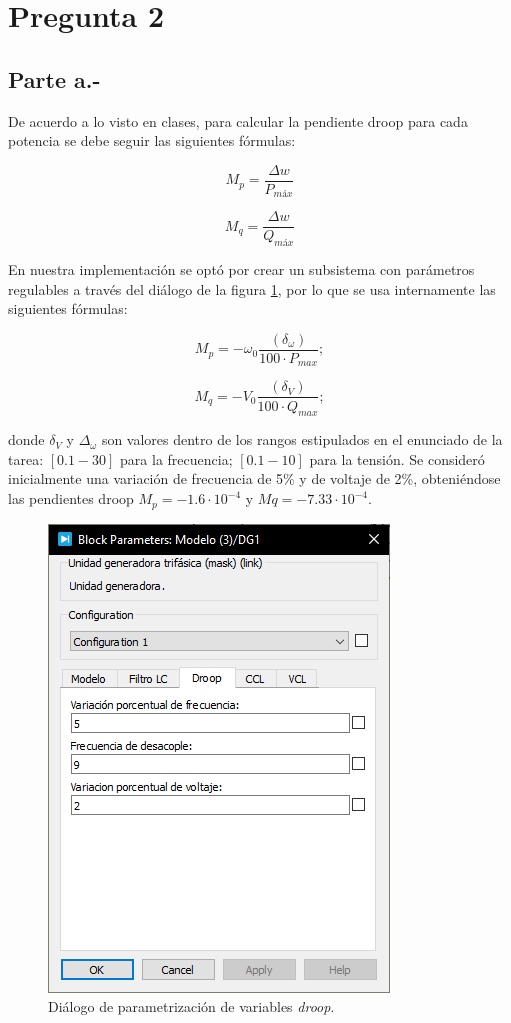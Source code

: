\section{Pregunta 2}

\subsection{Parte a.-}

De acuerdo a lo visto en clases, para calcular la pendiente droop para cada potencia se debe seguir las siguientes fórmulas:

\begin{equation}
    M_p = \frac{\Delta w}{P_{máx}}
\end{equation}

\begin{equation}
    M_q = \frac{\Delta w}{Q_{máx}}
\end{equation}

En nuestra implementación se optó por crear un subsistema con parámetros regulables a través del diálogo de la figura \ref{dialogo_dg}, por lo que se usa internamente las siguientes fórmulas:

\begin{equation*}    
M_p = -\omega_0\frac{(\delta_\omega)}{100\cdot P_{max}};
\end{equation*}

\begin{equation*}
M_q = -V_0\frac{(\delta_V)}{100\cdot Q_{max}};
    
\end{equation*}

donde $\delta_V$ y $\Delta_\omega$ son valores dentro de los rangos estipulados en el enunciado de la tarea: $[0.1 - 30]$ para la frecuencia; $[0.1 - 10]$ para la tensión. Se consideró inicialmente una variación de frecuencia de 5\% y de voltaje de 2\%, obteniéndose las pendientes droop $M_p = -1.6\cdot 10^{-4}$ y $ Mq = -7.33 \cdot 10^{-4}$.\\

\begin{figure}
   \centering
   \includegraphics[width=0.5\linewidth]{Tarea 1/report/imagenes/p2a/dialogo_dg.png}
   \caption{Diálogo de parametrización de variables \textit{droop}.}
   \label{dialogo_dg}
\end{figure}

